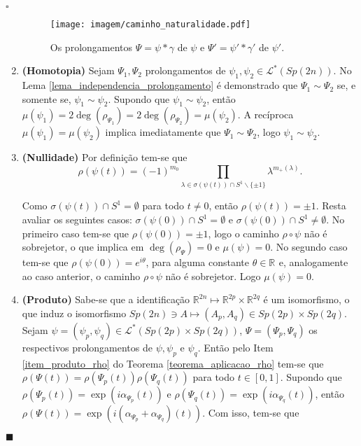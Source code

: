 \documentclass[12pt]{book}
\newenvironment{prova}[1]{$\square$ #1}{\hfill$\blacksquare$}
\newcommand{\caminhosespeciais}[1]{\mathcal{L}^{*}(#1)}
\newcommand{\circulo}{S^{1}}
\newcommand{\complementar}[2]{#1 \backslash #2}
\newcommand{\espectrooperador}[1]{\sigma(#1)}
\newcommand{\gruposimpletico}[1]{Sp(#1)}
\newcommand{\intervalo}{[0,1]}
\newcommand{\real}[1]{\mathbb{R}^{#1}}
\newcommand{\reta}{\real{}}
\begin{document}
\begin{prova}
\begin{enumerate}
			\begin{figure}[!h]
				\centering
				\texttt{[image: imagem/caminho\_naturalidade.pdf]}
				\caption{Os prolongamentos $\Psi=\psi*\gamma$ de $\psi$ e $\Psi'  = \psi'*\gamma'$ de $\psi'$.}
			\end{figure}
			
			\item \textbf{(Homotopia)} Sejam $\Psi_{1}, \Psi_{2}$ prolongamentos de $\psi_{1}, \psi_{2} \in \caminhosespeciais{\gruposimpletico{2n}}$. No Lema \ref{lema_independencia_prolongamento} é demonstrado que $\Psi_{1}\sim \Psi_{2}$ se, e somente se, $\psi_{1}\sim \psi_{2}$. Supondo que $\psi_{1}\sim \psi_{2}$, então $\mu(\psi_{1}) = 2\deg(\rho_{\Psi_{1}}) = 2\deg(\rho_{\Psi_{2}}) = \mu(\psi_{2})$. A recíproca $\mu(\psi_{1}) = \mu(\psi_{2})$ implica imediatamente que $\Psi_{1}\sim \Psi_{2}$, logo $\psi_{1}\sim \psi_{2}$.
			
			\item \textbf{(Nullidade)} Por definição tem-se que 
			$$
			\rho(\psi(t)) = (-1)^{m_{0}} \prod_{\lambda \in \sigma(\psi(t))\cap \complementar{\circulo}{\{\pm 1 \}  }}\lambda^{m_{+}(\lambda)}.
			$$
			
			Como  $\espectrooperador{\psi(t)}\cap \circulo = \emptyset$ para todo $t\neq 0$, então $	\rho(\psi(t))=\pm 1$. Resta avaliar os seguintes casos: $\espectrooperador{\psi(0)}\cap \circulo = \emptyset$ e $\espectrooperador{\psi(0)}\cap \circulo \neq \emptyset$. No primeiro caso tem-se que $	\rho(\psi(0))=\pm 1$, logo o caminho  $\rho\circ\psi$ não é sobrejetor, o que implica em $\deg(\rho_{\Psi}) = 0$ e $\mu(\psi) = 0$. No segundo caso tem-se que $	\rho(\psi(0))=e^{i\theta}$, para alguma constante $\theta \in \reta$ e, analogamente ao caso anterior, o caminho $\rho\circ\psi$ não é sobrejetor. Logo $\mu(\psi)=0$. 
			
			\item \textbf{(Produto)} Sabe-se que a identificação $\real{2n} \mapsto \real{2p}\times \real{2q}$ é um isomorfismo, o que induz o isomorfismo $\gruposimpletico{2n} \ni A \mapsto (A_{p}, A_{q}) \in \gruposimpletico{2p} \times \gruposimpletico{2q}$. Sejam $\psi=(\psi_{p}, \psi_{q}) \in \caminhosespeciais{\gruposimpletico{2p}\times \gruposimpletico{2q}}$, $\Psi=(\Psi_{p}, \Psi_{q})$ os respectivos prolongamentos de $\psi, \psi_{p}$ e $\psi_{q}$. Então pelo Item \ref{item_produto_rho} do Teorema \ref{teorema_aplicacao_rho} tem-se que $\rho(\Psi(t))=\rho(\Psi_{p}(t))\rho(\Psi_{q}(t))$ para todo $t\in \intervalo$. Supondo que $\rho(\Psi_{p}(t))=\exp(i\alpha_{\Psi_{p}}(t))$ e $\rho(\Psi_{q}(t))=\exp(i\alpha_{\Psi_{q}}(t))$, então $\rho(\Psi(t)) = \exp(i(\alpha_{\Psi_{p}}+\alpha_{\Psi_{q}})(t))$. Com isso, tem-se que 
			

\end{enumerate}
\end{prova}
\end{document}
